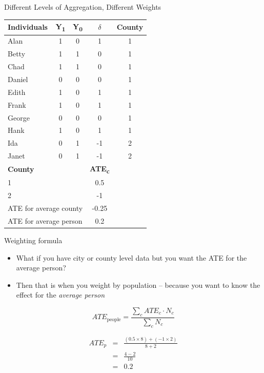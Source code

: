 \documentclass{beamer}
\begin{document}
\begin{frame}{Different Levels of Aggregation, Different Weights}

\begin{table}[htbp]\centering
\footnotesize
\begin{tabular}{lcccc}
\toprule
\textbf{Individuals} & \textbf{Y\textsubscript{1}} & \textbf{Y\textsubscript{0}} & \textbf{$\delta$} & \textbf{County} \\
\midrule
Alan    & 1 & 0 & 1  & \cellcolor{yellow!30}1 \\
Betty   & 1 & 1 & 0  & \cellcolor{yellow!30}1 \\
Chad    & 1 & 1 & 0  & \cellcolor{yellow!30}1 \\
Daniel  & 0 & 0 & 0  & \cellcolor{yellow!30}1 \\
Edith   & 1 & 0 & 1  & \cellcolor{yellow!30}1 \\
Frank   & 1 & 0 & 1  & \cellcolor{yellow!30}1 \\
George  & 0 & 0 & 0  & \cellcolor{yellow!30}1 \\
Hank    & 1 & 0 & 1  & \cellcolor{yellow!30}1 \\
Ida     & 0 & 1 & -1 & \cellcolor{green!20}2 \\
Janet   & 0 & 1 & -1 & \cellcolor{green!20}2 \\
\midrule
\textbf{County} & & & \textbf{ATE\textsubscript{c}} & \\
\cellcolor{yellow!30}1 & & & \cellcolor{yellow!30}0.5 & \\
\cellcolor{green!20}2 & & & \cellcolor{green!20}-1 & \\
\midrule
\multicolumn{3}{l}{ATE for average county} & -0.25 & \\
\multicolumn{3}{l}{ATE for average person}   & 0.2 & \\
\bottomrule
\end{tabular}
\end{table}


\end{frame}

\begin{frame}{Weighting formula}

\begin{itemize}
\item What if you have city or county level data but you want the ATE for the average person?
\item Then that is when you weight by population -- because you want to know the effect for the \emph{average person}
\end{itemize}

\begin{equation}
ATE_{\text{people}} = \frac{\sum_c ATE_c \cdot N_c}{\sum_c N_c}
\end{equation}

\begin{eqnarray*}
ATE_p &=& \frac{(0.5 \times 8) + (-1 \times 2)}{8 + 2} \\
      &=& \frac{4 - 2}{10} \\
      &=& 0.2
\end{eqnarray*}

\end{frame}
\end{document}
